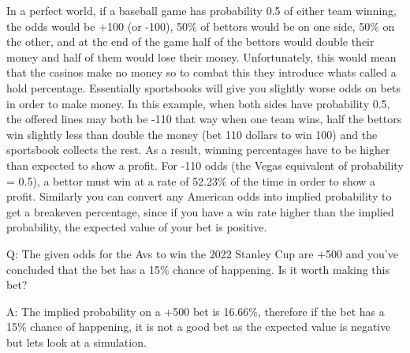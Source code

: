 \documentclass[]{article}
\newenvironment{Shaded}{\begin{snugshade}}{\end{snugshade}}
\newcommand{\CommentTok}[1]{\textcolor[rgb]{0.56,0.35,0.01}{\textit{#1}}}
\newcommand{\ControlFlowTok}[1]{\textcolor[rgb]{0.13,0.29,0.53}{\textbf{#1}}}
\newcommand{\DecValTok}[1]{\textcolor[rgb]{0.00,0.00,0.81}{#1}}
\newcommand{\FloatTok}[1]{\textcolor[rgb]{0.00,0.00,0.81}{#1}}
\newcommand{\KeywordTok}[1]{\textcolor[rgb]{0.13,0.29,0.53}{\textbf{#1}}}
\newcommand{\NormalTok}[1]{#1}
\newcommand{\OperatorTok}[1]{\textcolor[rgb]{0.81,0.36,0.00}{\textbf{#1}}}
\newcommand{\StringTok}[1]{\textcolor[rgb]{0.31,0.60,0.02}{#1}}
\begin{document}
In a perfect world, if a baseball game has probability 0.5 of either
team winning, the odds would be +100 (or -100), 50\% of bettors would be
on one side, 50\% on the other, and at the end of the game half of the
bettors would double their money and half of them would lose their
money. Unfortunately, this would mean that the casinos make no money so
to combat this they introduce whats called a hold percentage.
Essentially sportsbooks will give you slightly worse odds on bets in
order to make money. In this example, when both sides have probability
0.5, the offered lines may both be -110 that way when one team wins,
half the bettors win slightly less than double the money (bet 110
dollars to win 100) and the sportsbook collects the rest. As a result,
winning percentages have to be higher than expected to show a profit.
For -110 odds (the Vegas equivalent of probability = 0.5), a bettor must
win at a rate of 52.23\% of the time in order to show a profit.
Similarly you can convert any American odds into implied probability to
get a breakeven percentage, since if you have a win rate higher than the
implied probability, the expected value of your bet is positive.

Q: The given odds for the Avs to win the 2022 Stanley Cup are +500 and
you've concluded that the bet has a 15\% chance of happening. Is it
worth making this bet?

A: The implied probability on a +500 bet is 16.66\%, therefore if the
bet has a 15\% chance of happening, it is not a good bet as the expected
value is negative but lets look at a simulation.

\begin{Shaded}
\end{Shaded}
\end{document}

